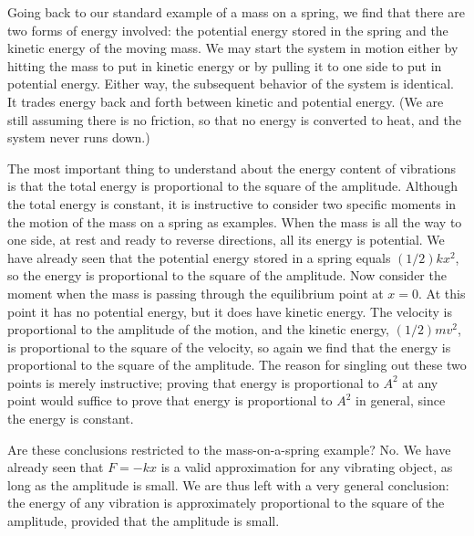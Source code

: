 Going back to our standard example of a mass on a spring, we
find that there are two forms of energy involved: the
potential energy stored in the spring and the kinetic energy
of the moving mass. We may start the system in motion either
by hitting the mass to put in kinetic energy or by pulling it
to one side to put in potential energy. Either way, the
subsequent behavior of the system is identical. It trades
energy back and forth between kinetic and potential energy.
(We are still assuming there is no friction, so that no
energy is converted to heat, and the system never runs down.)

\enlargethispage{-2\baselineskip}

The most important thing to understand about the energy
content of vibrations is that the total energy is proportional
to the square of the amplitude.
Although the total energy is
constant, it is instructive to consider two specific moments
in the motion of the mass on a spring as examples. When the
mass is all the way to one side, at rest and ready to
reverse directions, all its energy is potential. We have
already seen that the potential energy stored in a spring
equals $(1/2)kx^2$, so the energy is proportional to the square of the
amplitude. Now consider the moment when the mass is passing
through the equilibrium point at $x=0$. At this point it has
no potential energy, but it does have kinetic energy. The
velocity is proportional to the amplitude of the motion, and
the kinetic energy, $(1/2)mv^2$, is proportional to the square of the
velocity, so again we find that the energy is proportional
to the square of the amplitude. The reason for singling out
these two points is merely instructive; proving that energy
is proportional to $A^2$ at any point would suffice to prove
that energy is proportional to $A^2$ in general, since
the energy is constant.

\enlargethispage{-2\baselineskip}

Are these conclusions restricted to the mass-on-a-spring
example? No. We have already seen that $F=-kx$ is a
valid approximation for any vibrating object, as long as the
amplitude is small. We are thus left with a very general
conclusion: the energy of any vibration is approximately
proportional to the square of the amplitude, provided that
the amplitude is small.

